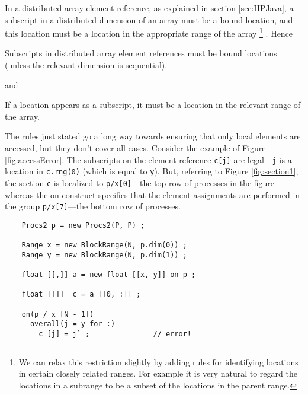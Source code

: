 \documentclass{article}
\begin{document}
In a distributed array element reference,
as explained in section \ref{sec:HPJava}, a subscript in 
a distributed dimension of an array must be a bound location,
and this location must be a location in the appropriate range of the array%
\footnote{We can relax this restriction slightly by adding rules for
identifying locations in certain closely related ranges.
For example it is very natural to regard the locations in a subrange
to be a subset of the locations in the parent range.}%
.  Hence
\begin{usageRule}
Subscripts in distributed array element references must be bound
locations (unless the relevant dimension is sequential).
\end{usageRule}
and
\begin{usageRule}
If a location appears as a subscript,
it must be a location in the relevant range of the array.
\end{usageRule}

The rules just stated go a long way towards ensuring that only local
elements are accessed, but they don't cover all cases.
Consider the example of Figure \ref{fig:accessError}.
The subscripts on the element reference {\tt c[j]} are legal---{\tt j}
is a location in {\tt c.rng(0)} (which is equal to {\tt y}).
But, referring to Figure \ref{fig:section1}, the section
{\tt c} is localized to {\tt p/x[0]}---the top row of processes
in the figure---whereas the on construct
specifies that the element assignments are performed in the group
{\tt p/x[7]}---the bottom row of processes.

\begin{figure*}[tbp]
\small
\begin{verbatim}
    Procs2 p = new Procs2(P, P) ;

    Range x = new BlockRange(N, p.dim(0)) ;
    Range y = new BlockRange(N, p.dim(1)) ;

    float [[,]] a = new float [[x, y]] on p ;

    float [[]]  c = a [[0, :]] ;

    on(p / x [N - 1])
      overall(j = y for :)
        c [j] = j` ;               // error!
\end{verbatim}
\normalsize
\caption{Erroneous access to non-local elements of a section
\label{fig:accessError}}
\end{figure*}
\end{document}
